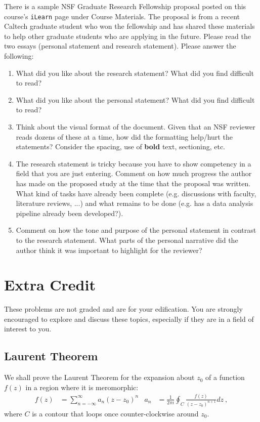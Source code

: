 \documentclass[12pt]{article}
\numberwithin{equation}{subsection}    %
\begin{document}
There is a sample NSF Graduate Research Fellowship proposal posted on this course's \texttt{iLearn} page under Course Materials. The proposal is from a recent Caltech graduate student who won the fellowship and has shared these materials to help other graduate students who are applying in the future. Please read the two essays (personal statement and research statement). Please answer the following:
\begin{enumerate}
	\item What did you like about the research statement? What did you find difficult to read?
	\item What did you like about the personal statement? What did you find difficult to read?
	\item Think about the visual format of the document. Given that an NSF reviewer reads dozens of these at a time, how did the formatting help/hurt the statements? Consider the spacing, use of \textbf{bold} text, sectioning, etc.
	\item The research statement is tricky because you have to show competency in a field that you are just entering. Comment on how much progress the author has made on the proposed study at the time that the proposal was written. What kind of tasks have already been complete (e.g. discussions with faculty, literature reviews, ...) and what remains to be done (e.g. has a data analysis pipeline already been developed?). 
	\item Comment on how the tone and purpose of the personal statement in contrast to the research statement. What parts of the personal narrative did the author think it was important to highlight for the reviewer?
\end{enumerate}





\section{Extra Credit}

These problems are not graded and are for your edification. You are strongly encouraged to explore and discuss these topics, especially if they are in a field of interest to you.


\subsection{Laurent Theorem}

We shall prove the Laurent Theorem for the expansion about $z_0$ of a function $f(z)$ in a region where it is meromorphic:
\begin{align}
f(z) &= \sum_{n=-\infty}^{\infty} a_n (z-z_0)^n
&
a_n &= \frac{1}{2\pi i} \oint_C \frac{f(z)}{(z-z_0)^{n+1}} dz \ ,
\end{align}
where $C$ is a contour that loops once counter-clockwise around $z_0$.
\end{document}
